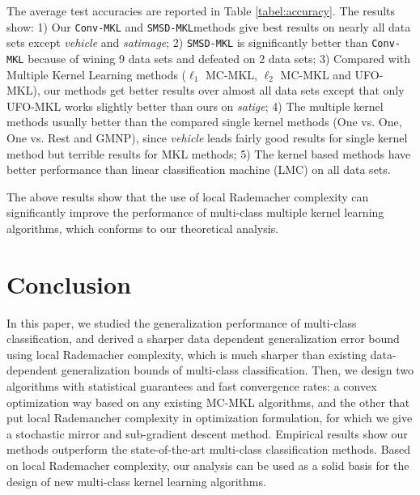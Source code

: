 \documentclass{article}
\begin{document}
The average test accuracies are reported in Table \ref{tabel:accuracy}. 
The results show: 1) Our \texttt{Conv-MKL} and \texttt{SMSD-MKL}methods give best results on nearly all data sets
except \textit{vehicle} and \textit{satimage};
2) \texttt{SMSD-MKL} is significantly better than \texttt{Conv-MKL} because of wining 9 data sets and defeated on 2 data sets;
3) Compared with Multiple Kernel Learning methods ($\ell_1$ MC-MKL, $\ell_2$ MC-MKL and UFO-MKL),
our methods get better results over almost all data sets except that only UFO-MKL works slightly better than ours on \textit{satige};
4) The multiple kernel methods usually better than the compared single kernel methods (One vs. One, One vs. Rest and GMNP),
since \textit{vehicle} leads fairly good results for single kernel method but terrible results for MKL methods;
5) The kernel based methods have better performance than linear classification machine (LMC) on all data sets.

The above results show that the use of local Rademacher complexity can significantly improve
the performance of multi-class multiple kernel learning algorithms,
which conforms to our theoretical analysis.
\section{Conclusion}
In this paper, we studied the generalization performance of multi-class classification,
and derived a sharper data dependent generalization error bound using local Rademacher complexity,
which is much sharper than existing data-dependent generalization bounds of multi-class classification.
Then, we design two algorithms with statistical guarantees and fast convergence rates:
a convex optimization way based on any existing MC-MKL algorithms,
and the other that put local Rademancher complexity in optimization formulation,
for which we give a stochastic mirror and sub-gradient descent method.
Empirical results show our methods outperform the state-of-the-art multi-class classification methods.
Based on local Rademacher complexity, our analysis can be used as a solid basis for the
design of new multi-class kernel learning algorithms.




\end{document}
